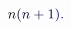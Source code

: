 \documentclass[12pt]{article}
\begin{document}
\makeatletter
\renewcommand*{\@textcolor}[3]{%
  \protect\leavevmode
  \begingroup
    \color#1{#2}#3%
  \endgroup
}
\makeatother
\begin{displaymath}
\mathcolor[RGB]{0,0,15}{n} \mathcolor[RGB]{0,0,30}{(} \mathcolor[RGB]{0,0,45}{n} \mathcolor[RGB]{0,0,60}{+} \mathcolor[RGB]{0,0,75}{1} \mathcolor[RGB]{0,0,90}{)} \mathcolor[RGB]{0,0,105}{.}
\end{displaymath}
\end{document}
